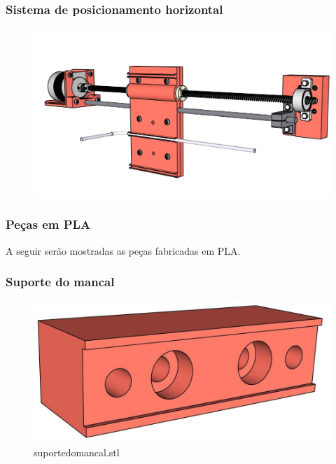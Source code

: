 \begin{frame}
    \frametitle{Sistema de posicionamento horizontal}  
        \begin{figure}
            \centering
            \includegraphics[scale = 0.2]{figuras/sistemaposicionamentohorizontal}
        \end{figure}
\end{frame}

\begin{frame}
    \frametitle{Peças em PLA}
    
    A seguir serão mostradas as peças fabricadas em PLA.

\end{frame}

\begin{frame}
    \frametitle{Suporte do mancal}
        \begin{figure}
            \centering
            \includegraphics[scale = 0.2]{figuras/ressuportemancal}
            \caption{suportedomancal.stl}
        \end{figure}
\end{frame}

